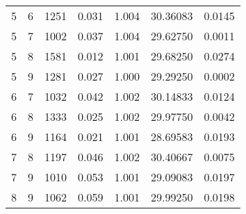 \begin{longtable}{rrrrrrr}
5 & 6 & 1251 & 0.031 & 1.004 & 30.36083 & 0.0145 \\ 
5 & 7 & 1002 & 0.037 & 1.004 & 29.62750 & 0.0011 \\ 
5 & 8 & 1581 & 0.012 & 1.001 & 29.68250 & 0.0274 \\ 
5 & 9 & 1281 & 0.027 & 1.000 & 29.29250 & 0.0002 \\ 
6 & 7 & 1032 & 0.042 & 1.002 & 30.14833 & 0.0124 \\ 
6 & 8 & 1333 & 0.025 & 1.002 & 29.97750 & 0.0042 \\ 
6 & 9 & 1164 & 0.021 & 1.001 & 28.69583 & 0.0193 \\ 
7 & 8 & 1197 & 0.046 & 1.002 & 30.40667 & 0.0075 \\ 
7 & 9 & 1010 & 0.053 & 1.001 & 29.09083 & 0.0197 \\ 
8 & 9 & 1062 & 0.059 & 1.001 & 29.99250 & 0.0198 \\ 
\bottomrule
\end{longtable}

